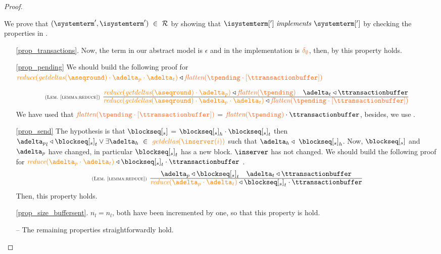 \begin{proof}
\begin{itemize}
\begin{itemize}
				We  prove that $(\systemterm',\isystemterm') \ \in \ \mathcal{R}$ by showing that $\implements{\isystemterm[']}{\systemterm[']}$ 
				by checking the properties in .			
					\begin{enumerate}
						\item[\ref{prop_transactions}.] Now, the term in our abstract model is $\epsilon$ and in the implementation is $\emptydelta$, then, by \triangemptydelta this property holds.
						
						\item[\ref{prop_pending}] We should build the following proof for 
						$\ireduce{\igetdeltas{\pending}\cdot{\pushbuffer}\cdot \transactionbuffer}\triangleleft \flatten{\tpending\cdot [\ttransactionbuffer]} \ $
						
					\[
						  \mathrulean{\lemref{lemma:reduce}}
						  {\ireduce{\igetdeltas{\pending}\cdot{\pushbuffer}} \triangleleft \flatten{\tpending}
								\quad
								\transactionbuffer \triangleleft \ttransactionbuffer}
  						{\ireduce{\igetdeltas{\pending}\cdot{\pushbuffer}\cdot \transactionbuffer}\triangleleft \flatten{\tpending\cdot [\ttransactionbuffer]}}  
					\]
					We have used that $\flatten{\tpending\cdot [\ttransactionbuffer]}$ = $\flatten{\tpending} \cdot \ttransactionbuffer$, besides, we use .
					  
						\item[\ref{prop_send}] The hypothesis is that $\tsent$ = ${\tsent}_h \cdot {\tsent}_t $ then $ {\pushbuffer}_l \triangleleft {\tsent}_t \lor \exists \adelta_h\ \in \ \igetdeltas{\inserver(i)}$ such that $\adelta_h \triangleleft \ {\tsent}_h$. Now, $\tsent$ and $\pushbuffer$ have changed, in particular ${\tsent}_t $ has a new block. $\inserver$ has not changed. We should build the following proof for $\ireduce{{\pushbuffer}\cdot \transactionbuffer}\triangleleft {\tsent}_t\cdot\ttransactionbuffer \ $.
						\[
						  \mathrulean{\lemref{lemma:reduce}}
						  {\pushbuffer \triangleleft {\tsent}_t
								\quad
								\transactionbuffer \triangleleft \ttransactionbuffer}
  						{\ireduce{{\pushbuffer}\cdot \transactionbuffer}\triangleleft {\tsent}_t\cdot\ttransactionbuffer}  
					\]
						Then, this property holds.
						\item[\ref{prop_size_buffersent}.] $n_l = n_l$, both have been incremented by one, so that this property is hold.
						\item[{--}] The remaining properties straightforwardly hold.
								

\end{enumerate}
\end{itemize}
\end{itemize}
\end{proof}
